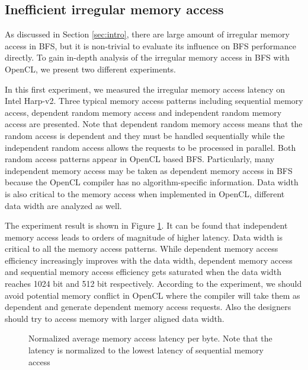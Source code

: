 
\subsection{Inefficient irregular memory access}
As discussed in Section \ref{sec:intro}, there are large amount of irregular memory access in BFS, 
but it is non-trivial to evaluate its influence on BFS performance directly. To gain in-depth 
analysis of the irregular memory access in BFS with OpenCL, we present two different experiments.

In this first experiment, we measured the irregular memory access latency on Intel Harp-v2.
Three typical memory access patterns including sequential memory access, dependent random memory access 
and independent random memory access are presented. Note that dependent random memory access 
means that the random access is dependent and they must be handled sequentially while the independent random 
access allows the requests to be processed in parallel. Both random access patterns appear in OpenCL based BFS.
Particularly, many independent memory access may be taken as dependent memory access in BFS because the 
OpenCL compiler has no algorithm-specific information. Data width is also critical to the memory access 
when implemented in OpenCL, different data width are 
analyzed as well. 

The experiment result is shown in Figure \ref{fig:avg-mem-lat}. It can be found that independent memory 
access leads to orders of magnitude of higher latency. Data width is critical to all the memory access patterns.
While dependent memory access efficiency increasingly improves with the data width, dependent memory access and sequential memory 
access efficiency gets saturated when the data width reaches 1024 bit and 512 bit respectively. According to the experiment, 
we should avoid potential memory conflict in OpenCL where the compiler will take them as dependent and generate 
dependent memory access requests. Also the designers should try to access memory with larger aligned data width. 
\begin{figure}
    \caption{Normalized average memory access latency per byte. Note that the latency is normalized to the 
	lowest latency of sequential memory access}
\label{fig:avg-mem-lat}
\vspace{-0.5em}
\end{figure}


